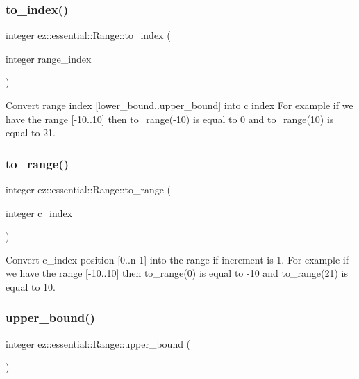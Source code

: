 \subsubsection{\texorpdfstring{to\+\_\+index()}{to\_index()}}
{\footnotesize\ttfamily integer ez\+::essential\+::\+Range\+::to\+\_\+index (\begin{DoxyParamCaption}\item[{integer}]{range\+\_\+index }\end{DoxyParamCaption})\hspace{0.3cm}{\ttfamily [inline]}}

Convert range index \mbox{[}lower\+\_\+bound..upper\+\_\+bound\mbox{]} into c index For example if we have the range \mbox{[}-\/10..10\mbox{]} then to\+\_\+range(-\/10) is equal to 0 and to\+\_\+range(10) is equal to 21. \mbox{\label{classez_1_1essential_1_1Range_a89f7d608969f4d59d713d88a44f3b60f}} 
\subsubsection{\texorpdfstring{to\+\_\+range()}{to\_range()}}
{\footnotesize\ttfamily integer ez\+::essential\+::\+Range\+::to\+\_\+range (\begin{DoxyParamCaption}\item[{integer}]{c\+\_\+index }\end{DoxyParamCaption})\hspace{0.3cm}{\ttfamily [inline]}}

Convert c\+\_\+index position \mbox{[}0..n-\/1\mbox{]} into the range if increment is 1. For example if we have the range \mbox{[}-\/10..10\mbox{]} then to\+\_\+range(0) is equal to -\/10 and to\+\_\+range(21) is equal to 10. \mbox{\label{classez_1_1essential_1_1Range_a9310aea152b51bfe658afecc318c84b6}} 
\subsubsection{\texorpdfstring{upper\+\_\+bound()}{upper\_bound()}\hspace{0.1cm}{\footnotesize\ttfamily [1/2]}}
{\footnotesize\ttfamily integer ez\+::essential\+::\+Range\+::upper\+\_\+bound (\begin{DoxyParamCaption}{ }\end{DoxyParamCaption})\hspace{0.3cm}{\ttfamily [inline]}}

